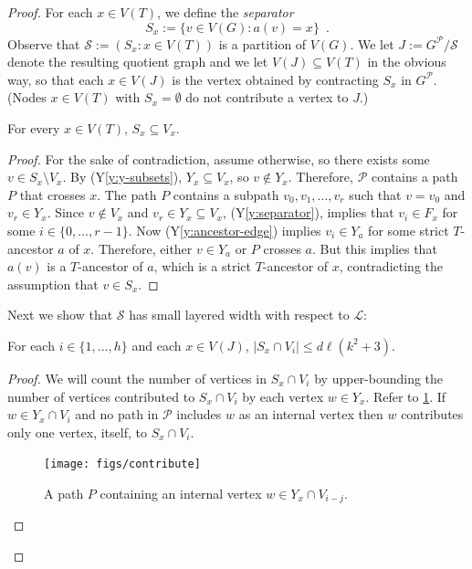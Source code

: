 \documentclass{patmorin}
\newcommand{\yref}[1]{(Y\ref{y:#1})}
\renewcommand{\le}{\leqslant}
\begin{document}
\begin{proof}
For each $x\in V(T)$, we define the \emph{separator}
\[  
     S_x := \{v\in V(G): a(v)= x\} \enspace .
\]
Observe that $\mathcal{S}:=(S_x : x\in V(T))$ is a partition of $V(G)$.  We let $J:=G^\mathcal{P}/\mathcal{S}$ denote the resulting quotient graph and we let $V(J)\subseteq V(T)$ in the obvious way, so that each $x\in V(J)$ is the vertex obtained by contracting $S_x$ in $G^{\mathcal{P}}$. (Nodes $x\in V(T)$ with $S_x=\emptyset$ do not contribute a vertex to $J$.)

\begin{clm}
  For every $x\in V(T)$, $S_x\subseteq V_x$.
\end{clm}

\begin{proof}
  For the sake of contradiction, assume otherwise, so there exists some $v\in S_x\setminus V_x$. By \yref{y-subsets}, $Y_x\subseteq V_x$, so $v\not\in Y_x$.  Therefore, $\mathcal{P}$ contains a path $P$ that crosses $x$.  The path $P$ contains a subpath $v_0,v_1,\ldots,v_{r}$ such that $v=v_0$ and $v_r\in Y_x$. Since $v\not\in V_x$ and $v_r\in Y_x\subseteq V_x$, \yref{separator}, implies that $v_i\in F_x$ for some $i\in\{0,\ldots,r-1\}$. Now \yref{ancestor-edge} implies $v_i\in Y_a$ for some strict $T$-ancestor $a$ of $x$.  Therefore, either $v\in Y_a$ or $P$ crosses $a$. But this implies that $a(v)$ is a $T$-ancestor of $a$, which is a strict $T$-ancestor of $x$, contradicting the assumption that $v\in S_x$.
\end{proof}

Next we show that $\mathcal{S}$ has small layered width with respect to $\mathcal{L}$:

\begin{clm}
  For each $i\in\{1,\ldots,h\}$ and each $x\in V(J)$, $|S_x\cap V_i|\le d\ell(k^2+3)$.  
\end{clm}

\begin{proof}
  We will count the number of vertices in $S_x\cap V_i$ by upper-bounding the number of vertices contributed to $S_x\cap V_i$ by each vertex $w\in Y_x$. Refer to \cref{contribute}.
  If $w\in Y_x\cap V_i$ and no path in $\mathcal{P}$ includes $w$ as an internal vertex then $w$ contributes only one vertex, itself, to $S_x\cap V_i$.
  
  \begin{figure}[htbp]
    \begin{center}
      \texttt{[image: figs/contribute]}
    \end{center}
    \caption{A path $P$ containing an internal vertex $w\in Y_x\cap V_{i-j}$.}
    \label{contribute}
  \end{figure}


\end{proof}
\end{proof}
\end{document}
